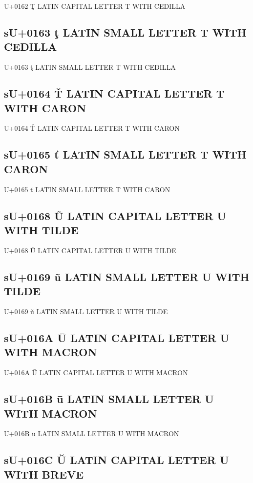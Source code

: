 U+0162 Ţ  LATIN CAPITAL LETTER T WITH CEDILLA

\subsection{sU+0163 ţ  LATIN SMALL LETTER T WITH CEDILLA}

U+0163 ţ  LATIN SMALL LETTER T WITH CEDILLA

\subsection{sU+0164 Ť  LATIN CAPITAL LETTER T WITH CARON}

U+0164 Ť  LATIN CAPITAL LETTER T WITH CARON

\subsection{sU+0165 ť  LATIN SMALL LETTER T WITH CARON}

U+0165 ť  LATIN SMALL LETTER T WITH CARON

\subsection{sU+0168 Ũ  LATIN CAPITAL LETTER U WITH TILDE}

U+0168 Ũ  LATIN CAPITAL LETTER U WITH TILDE

\subsection{sU+0169 ũ  LATIN SMALL LETTER U WITH TILDE}

U+0169 ũ  LATIN SMALL LETTER U WITH TILDE

\subsection{sU+016A Ū  LATIN CAPITAL LETTER U WITH MACRON}

U+016A Ū  LATIN CAPITAL LETTER U WITH MACRON

\subsection{sU+016B ū  LATIN SMALL LETTER U WITH MACRON}

U+016B ū  LATIN SMALL LETTER U WITH MACRON

\subsection{sU+016C Ŭ  LATIN CAPITAL LETTER U WITH BREVE}

